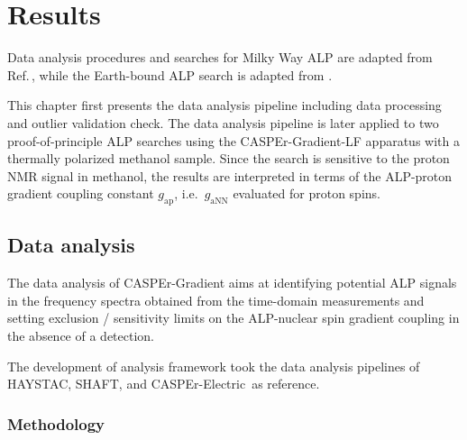 \chapter{Results}\label{chap:results}
\begin{jointwork}
    Data analysis procedures and searches for Milky Way ALP are adapted from Ref.\,\cite{Walter2024_LFthermal}, while the Earth-bound ALP search is adapted from .
\end{jointwork}

This chapter first presents the data analysis pipeline including data processing and outlier validation check.
The data analysis pipeline is later applied to two proof-of-principle ALP searches using the CASPEr-Gradient-LF apparatus with a thermally polarized methanol sample. 
Since the search is sensitive to the proton NMR signal in methanol, the results are interpreted in terms of the ALP-proton gradient coupling constant $g_\mathrm{ap}$, i.e.\ $g_\mathrm{aNN}$ evaluated for proton spins.


\section{Data analysis}\label{sec:results:data-analysis}

The data analysis of CASPEr-Gradient aims at identifying potential ALP signals in the frequency spectra obtained from the time-domain measurements and setting exclusion / sensitivity limits on the ALP-nuclear spin gradient coupling in the absence of a detection.

The development of analysis framework took the data analysis pipelines of HAYSTAC, SHAFT, and CASPEr-Electric\,\cite{Brubaker2017_HAYSTAC, Gramolin2021_Ferromagnetic, aybas2021_SolidStateNMR} as reference. 

\subsection{Methodology}\label{sec:results:data-analysis:methodology}

